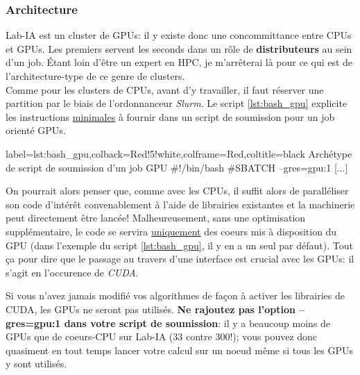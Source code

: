 \documentclass[13pt, a4paper]{extarticle}
\begin{document}
\subsubsection{Architecture}\label{sec:architecture}
\noindent Lab-IA est un cluster de GPUs: il y existe donc une concommittance entre
CPUs et GPUs. Les premiers servent les seconds dans un rôle de {\bf distributeurs}
au sein d'un job.
Étant loin d'être un expert en HPC, je m'arrêterai là pour ce qui est de l'architecture-type
de ce genre de clusters. \\
Comme pour les clusters de CPUs, avant d'y travailler,
il faut réserver une partition par le biais de l'ordonnanceur \emph{Slurm}. 
Le script \ref{lst:bash_gpu} explicite les instructions \underline{minimales} à fournir
dans un script de soumission pour un job orienté GPUs. 
\vspace{.2cm}

\noindent\begin{pythoncode}{label=lst:bash_gpu,colback=Red!5!white,colframe=Red,coltitle=black}
  {Archétype de script de soumission d'un job GPU}
  #!/bin/bash
  #SBATCH --gres=gpu:1
  [...]
\end{pythoncode}

\noindent On pourrait alors penser que, comme avec les CPUs, il suffit alors de paralléliser
son code d'intérêt convenablement à l'aide de librairies existantes et la machinerie
peut directement être lancée! Malheureusement, sans une optimisation 
supplémentaire, le code se servira \ul{uniquement} des coeurs mis à disposition
du GPU (dans l'exemple du script \ref{lst:bash_gpu}, il y en a un seul par défaut).
Tout ça pour dire que le passage au travers d'une interface est crucial avec les GPUs: 
il s'agit en l'occurence de \emph{CUDA}.\\

\begin{tcolorbox}[colback=Goldenrod] \noindent Si vous n'avez jamais modifié vos algorithmes de façon à activer
les librairies de CUDA, les GPUs ne seront pas utilisés. {\bf Ne rajoutez pas l'option
--gres=gpu:1 dans votre script de soumission}: il y a beaucoup moins de GPUs
que de coeurs-CPU sur Lab-IA (33 contre 300!); vous pouvez donc quasiment en tout temps
lancer votre calcul sur un noeud même si tous les GPUs y sont utilisés.
\end{tcolorbox}
\end{document}
